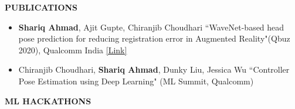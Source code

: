 \documentclass{article}
\begin{document}
\begin{theorem}
   \vspace{-0.7mm}
\begin{center}
\textbf{PUBLICATIONS
}\end{center}  
\vspace{-0.7mm}    
   \end{theorem}
 \vspace{-1.8mm}    
\begin{itemize}
   
  
\item \textbf{Shariq Ahmad}, Ajit Gupte, Chiranjib Choudhari ``WaveNet-based head pose prediction for reducing registration error in Augmented Reality"(Qbuz 2020), Qualcomm India \hfill{\href{https://drive.google.com/file/d/1SMd7aflcrMpDJxzN8-ZAy7w1xiP7tiTf/view?usp=sharing}{[Link]}} 

\item Chiranjib Choudhari, \textbf{Shariq Ahmad}, Dunky Liu, Jessica Wu  ``Controller Pose Estimation using Deep Learning" (ML Summit, Qualcomm) 

\end{itemize} 
 \vspace{-1.8mm}  
 \begin{theorem}
   \vspace{-0.7mm}
\begin{center}
\textbf{ ML HACKATHONS
}\end{center}  
  
   \end{theorem}
\vspace{-3.5mm}
\end{document}
